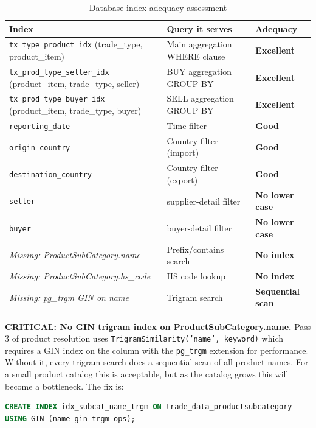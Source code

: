 \documentclass[12pt,a4paper]{article}
\newcommand{\cellOK}[1]{\cellcolor{okBg}\textcolor{zaraiGreen}{\textbf{#1}}}
\newcommand{\cellWarn}[1]{\cellcolor{warningBg}\textcolor{zaraiAmber}{\textbf{#1}}}
\newcommand{\cellBad}[1]{\cellcolor{errorBg}\textcolor{zaraiRed}{\textbf{#1}}}
\begin{document}
\begin{table}[H]
\centering
\renewcommand{\arraystretch}{1.3}
\begin{tabularx}{\textwidth}{Xll}
\toprule
\textbf{Index} & \textbf{Query it serves} & \textbf{Adequacy} \\
\midrule
\texttt{tx\_type\_product\_idx} (trade\_type, product\_item) & Main aggregation WHERE clause & \cellOK{Excellent} \\
\texttt{tx\_prod\_type\_seller\_idx} (product\_item, trade\_type, seller) & BUY aggregation GROUP BY & \cellOK{Excellent} \\
\texttt{tx\_prod\_type\_buyer\_idx} (product\_item, trade\_type, buyer) & SELL aggregation GROUP BY & \cellOK{Excellent} \\
\texttt{reporting\_date} & Time filter & \cellOK{Good} \\
\texttt{origin\_country} & Country filter (import) & \cellOK{Good} \\
\texttt{destination\_country} & Country filter (export) & \cellOK{Good} \\
\texttt{seller} & supplier-detail filter & \cellWarn{No lower case} \\
\texttt{buyer} & buyer-detail filter & \cellWarn{No lower case} \\
\midrule
\textit{Missing: ProductSubCategory.name} & Prefix/contains search & \cellBad{No index} \\
\textit{Missing: ProductSubCategory.hs\_code} & HS code lookup & \cellBad{No index} \\
\textit{Missing: pg\_trgm GIN on name} & Trigram search & \cellBad{Sequential scan} \\
\bottomrule
\end{tabularx}
\caption{Database index adequacy assessment}
\end{table}

\begin{issueBox}
\textbf{CRITICAL: No GIN trigram index on ProductSubCategory.name.}
Pass 3 of product resolution uses \texttt{TrigramSimilarity('name', keyword)} which
requires a GIN index on the column with the \texttt{pg\_trgm} extension for performance.
Without it, every trigram search does a sequential scan of all product names. For a
small product catalog this is acceptable, but as the catalog grows this will become
a bottleneck. The fix is:
\begin{lstlisting}[language=SQL]
CREATE INDEX idx_subcat_name_trgm ON trade_data_productsubcategory
USING GIN (name gin_trgm_ops);
\end{lstlisting}
\end{issueBox}
\end{document}
